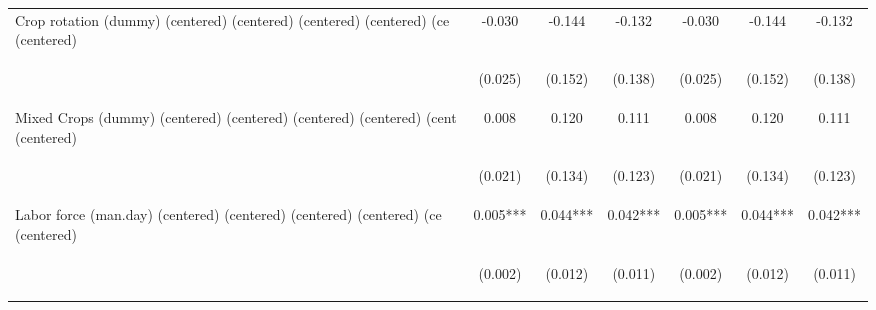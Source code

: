 \begin{center}
\begin{tabular}{lcccccc}
Crop rotation (dummy) (centered) (centered) (centered) (centered) (ce (centered) & -0.030 & -0.144 & -0.132 & -0.030 & -0.144 & -0.132 \\
\vspace{4pt} & \begin{footnotesize}(0.025)\end{footnotesize} & \begin{footnotesize}(0.152)\end{footnotesize} & \begin{footnotesize}(0.138)\end{footnotesize} & \begin{footnotesize}(0.025)\end{footnotesize} & \begin{footnotesize}(0.152)\end{footnotesize} & \begin{footnotesize}(0.138)\end{footnotesize} \\
Mixed Crops (dummy) (centered) (centered) (centered) (centered) (cent (centered) & 0.008 & 0.120 & 0.111 & 0.008 & 0.120 & 0.111 \\
\vspace{4pt} & \begin{footnotesize}(0.021)\end{footnotesize} & \begin{footnotesize}(0.134)\end{footnotesize} & \begin{footnotesize}(0.123)\end{footnotesize} & \begin{footnotesize}(0.021)\end{footnotesize} & \begin{footnotesize}(0.134)\end{footnotesize} & \begin{footnotesize}(0.123)\end{footnotesize} \\
Labor force (man.day) (centered) (centered) (centered) (centered) (ce (centered) & 0.005*** & 0.044*** & 0.042*** & 0.005*** & 0.044*** & 0.042*** \\
\vspace{4pt} & \begin{footnotesize}(0.002)\end{footnotesize} & \begin{footnotesize}(0.012)\end{footnotesize} & \begin{footnotesize}(0.011)\end{footnotesize} & \begin{footnotesize}(0.002)\end{footnotesize} & \begin{footnotesize}(0.012)\end{footnotesize} & \begin{footnotesize}(0.011)\end{footnotesize} \\

\end{tabular}
\end{center}
